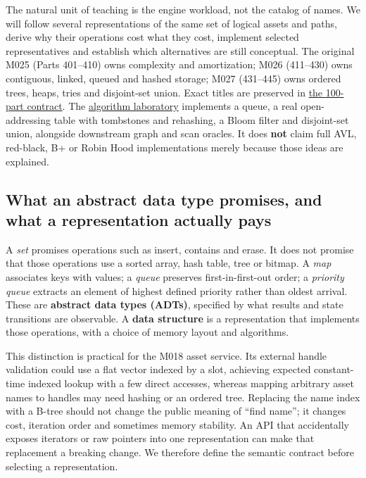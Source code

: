 The natural unit of teaching is the engine workload, not the catalog of names. We will follow several representations of the same set of logical assets and paths, derive why their operations cost what they cost, implement selected representatives and establish which alternatives are still conceptual. The original M025 (Parts 401--410) owns complexity and amortization; M026 (411--430) owns contiguous, linked, queued and hashed storage; M027 (431--445) owns ordered trees, heaps, tries and disjoint-set union. Exact titles are preserved in \hyperref[appendix-fd090d982a15-phase-5-algorithms-and-data-structure-workload-contracts-parts-401500]{the 100-part contract}. The \hyperref[source-file-0ec69e1a1a11439bca29faa5]{algorithm laboratory} implements a queue, a real open-addressing table with tombstones and rehashing, a Bloom filter and disjoint-set union, alongside downstream graph and scan oracles. It does \textbf{not} claim full AVL, red-black, B+ or Robin Hood implementations merely because those ideas are explained.

\subsection{What an abstract data type promises, and what a representation actually pays}\label{05-engine-i-ch007-what-an-abstract-data-type-promises-and-what-a-representation-actually-pays}

A \emph{set} promises operations such as insert, contains and erase. It does not promise that those operations use a sorted array, hash table, tree or bitmap. A \emph{map} associates keys with values; a \emph{queue} preserves first-in-first-out order; a \emph{priority queue} extracts an element of highest defined priority rather than oldest arrival. These are \textbf{abstract data types (ADTs)}, specified by what results and state transitions are observable. A \textbf{data structure} is a representation that implements those operations, with a choice of memory layout and algorithms.

This distinction is practical for the M018 asset service. Its external handle validation could use a flat vector indexed by a slot, achieving expected constant-time indexed lookup with a few direct accesses, whereas mapping arbitrary asset names to handles may need hashing or an ordered tree. Replacing the name index with a B-tree should not change the public meaning of ``find name''; it changes cost, iteration order and sometimes memory stability. An API that accidentally exposes iterators or raw pointers into one representation can make that replacement a breaking change. We therefore define the semantic contract before selecting a representation.

